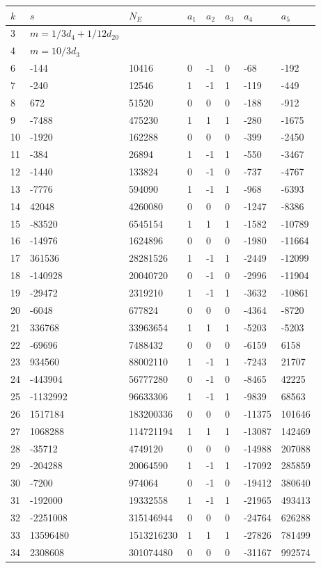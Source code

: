\documentclass{amsart}
\begin{document}
\begin{longtable}{|l|l|l|lllll|}
\hline
$k$ & $s$ & $N_E$ & $a_1$ & $a_2$ & $a_3$ & $a_4$ & $a_5$\\
\hline
3&$m=1/3d_{4}+1/12d_{20}$&&\multicolumn{5}{c|}{}\\
4&$m=10/3d_{3}$&&\multicolumn{5}{c|}{}\\
6&-144&10416&0&-1&0&-68&-192\\
7&-240&12546&1&-1&1&-119&-449\\
8&672&51520&0&0&0&-188&-912\\
9&-7488&475230&1&1&1&-280&-1675\\
10&-1920&162288&0&0&0&-399&-2450\\
11&-384&26894&1&-1&1&-550&-3467\\
12&-1440&133824&0&-1&0&-737&-4767\\
13&-7776&594090&1&-1&1&-968&-6393\\
14&42048&4260080&0&0&0&-1247&-8386\\
15&-83520&6545154&1&1&1&-1582&-10789\\
16&-14976&1624896&0&0&0&-1980&-11664\\
17&361536&28281526&1&-1&1&-2449&-12099\\
18&-140928&20040720&0&-1&0&-2996&-11904\\
19&-29472&2319210&1&-1&1&-3632&-10861\\
20&-6048&677824&0&0&0&-4364&-8720\\
21&336768&33963654&1&1&1&-5203&-5203\\
22&-69696&7488432&0&0&0&-6159&6158\\
23&934560&88002110&1&-1&1&-7243&21707\\
24&-443904&56777280&0&-1&0&-8465&42225\\
25&-1132992&96633306&1&-1&1&-9839&68563\\
26&1517184&183200336&0&0&0&-11375&101646\\
27&1068288&114721194&1&1&1&-13087&142469\\
28&-35712&4749120&0&0&0&-14988&207088\\
29&-204288&20064590&1&-1&1&-17092&285859\\
30&-7200&974064&0&-1&0&-19412&380640\\
31&-192000&19332558&1&-1&1&-21965&493413\\
32&-2251008&315146944&0&0&0&-24764&626288\\
33&13596480&1513216230&1&1&1&-27826&781499\\
34&2308608&301074480&0&0&0&-31167&992574\\

\end{longtable}
\end{document}
